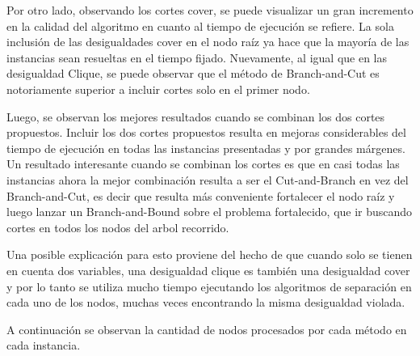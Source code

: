Por otro lado, observando los cortes cover, se puede visualizar un gran incremento en la calidad del algoritmo en cuanto al tiempo de ejecuci\'on se refiere. La sola inclusi\'on de las desigualdades cover en el nodo ra\'iz ya hace que la mayor\'ia de las instancias sean resueltas en el tiempo fijado. Nuevamente, al igual que en las desigualdad Clique, se puede observar que el m\'etodo de Branch-and-Cut es notoriamente superior a incluir cortes solo en el primer nodo.



Luego, se observan los mejores resultados cuando se combinan los dos cortes propuestos. Incluir los dos cortes propuestos resulta en mejoras considerables del tiempo de ejecuci\'on en todas las instancias presentadas y por grandes m\'argenes. Un resultado interesante cuando se combinan los cortes es que en casi todas las instancias ahora la mejor combinaci\'on resulta a ser el Cut-and-Branch en vez del Branch-and-Cut, es decir que resulta m\'as conveniente fortalecer el nodo ra\'iz y luego lanzar un Branch-and-Bound sobre el problema fortalecido, que ir buscando cortes en todos los nodos del arbol recorrido.

Una posible explicaci\'on para esto proviene del hecho de que cuando solo se tienen en cuenta dos variables, una desigualdad clique es tambi\'en una desigualdad cover y por lo tanto se utiliza mucho tiempo ejecutando los algoritmos de separaci\'on en cada uno de los nodos, muchas veces encontrando la misma desigualdad violada.

\bigskip

A continuaci\'on se observan la cantidad de nodos procesados por cada m\'etodo en cada instancia.



